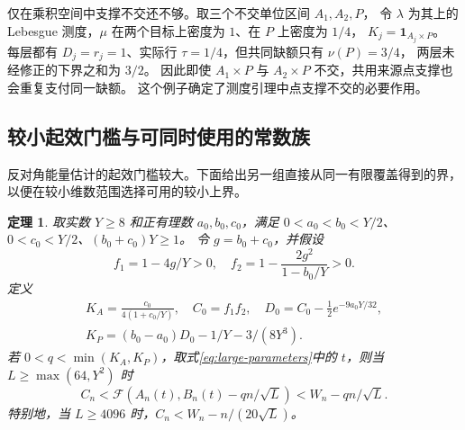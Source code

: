 \documentclass[UTF8,a4paper,11pt,fontset=fandol]{ctexart}
\newtheorem{theorem}{定理}
\theoremstyle{remark}
\newcommand{\one}{\mathbf 1}
\newcommand{\Fcal}{\mathcal F}
\begin{document}
仅在乘积空间中支撑不交还不够。取三个不交单位区间 $A_1,A_2,P$，
令 $\lambda$ 为其上的 Lebesgue 测度，$\mu$ 在两个目标上密度为 $1$、在 $P$ 上密度为 $1/4$，
$K_j=\one_{A_j\times P}$。
每层都有 $D_j=r_j=1$、实际行 $\tau=1/4$，但共同缺额只有 $\nu(P)=3/4$，
两层未经修正的下界之和为 $3/2$。
因此即使 $A_1\times P$ 与 $A_2\times P$ 不交，共用来源点支撑也会重复支付同一缺额。
这个例子确定了测度引理中点支撑不交的必要作用。

\subsection{较小起效门槛与可同时使用的常数族}
反对角能量估计的起效门槛较大。下面给出另一组直接从同一有限覆盖得到的界，
以便在较小维数范围选择可用的较小上界。
\begin{theorem}\label{thm:constant-family}
取实数 $Y\ge8$ 和正有理数 $a_0,b_0,c_0$，满足
$0<a_0<b_0<Y/2$、$0<c_0<Y/2$、$(b_0+c_0)Y\ge1$。
令 $g=b_0+c_0$，并假设
\[
 f_1=1-4g/Y>0,\quad f_2=1-\frac{2g^2}{1-b_0/Y}>0.
\]
定义
\[
 \begin{gathered}
 K_A=\frac{c_0}{4(1+c_0/Y)},\quad C_0=f_1f_2,\quad D_0=C_0-\tfrac12e^{-9a_0Y/32},\\
 K_P=(b_0-a_0)D_0-1/Y-3/(8Y^3).
 \end{gathered}
\]
若 $0<q<\min(K_A,K_P)$，取式\eqref{eq:large-parameters}中的 $t$，则当 $L\ge\max(64,Y^2)$ 时
\begin{equation}\label{eq:constant-family}
 C_n<\Fcal(A_n(t),B_n(t)-qn/\sqrt L)<W_n-qn/\sqrt L.
\end{equation}
特别地，当 $L\ge4096$ 时，$C_n<W_n-n/(20\sqrt L)$。
\end{theorem}
\end{document}
